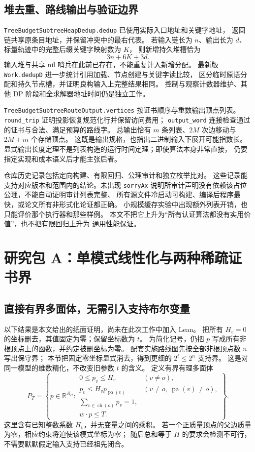 \documentclass[UTF8,a4paper,11pt,fontset=fandol]{ctexart}
\theoremstyle{definition}
\newcommand{\R}{\mathbb R}
\newcommand{\parv}{\operatorname{pa}}
\newcommand{\ch}{\operatorname{ch}}
\newcommand{\repo}[1]{\nolinkurl{#1}}
\begin{document}
\subsection{堆去重、路线输出与验证边界}

\repo{TreeBudgetSubtreeHeapDedup.dedup} 已使用实际入口地址和关键字地址，
返回链共享原条目地址，并保留冲突中的最右代表。
若输入链长为 $n$、输出长为 $d$、标量轨迹中的完整后缀关键字映射数为 $K$，
则新增持久堆槽恰为
\[
3n+6K+3d.
\]
输入堆与共享 nil 哨兵在此前已存在，不能重复计入新增分配。
最新版 \repo{Work.dedupD} 进一步统计引用加载、节点创建与关键字读比较，
区分临时原语分配和持久节点槽，并证明良构输入上完整结果相同。
控制与观察计数器维护、其他 DP 阶段和全求解器地址时间仍是独立工作。

\repo{TreeBudgetSubtreeRouteOutput.vertices} 按证书顺序与重数输出顶点列表。
\repo{round_trip} 证明投影恢复规范化行并保留访问费用；
\repo{output_word} 连接检查通过的证书与合法、满足预算的路线字。
总输出恰有 $m$ 条列表、$2M$ 次边移动与 $2M+m$ 个存储顶点。
这既是输出规格，也指出二进制输入下展开可能指数长。
显式输出长度定理不是列表构造的运行时间定理；即使算法本身非常直接，
仍要指定实现和成本语义后才能主张后者。

仓库历史记录包括定向构建、有限回归、公理审计和独立枚举比对。
这些记录能支持对应版本和范围内的结论。未出现 \repo{sorryAx}
说明所审计声明没有依赖该占位公理，不能自动证明审计列表完整、
所有源文件冷启动可构建、编译后程序最快，或论文所有非形式化论证都正确。
小规模缓存实验中出现额外列表开销，也只能评价那个执行器和那些样例。
本文不把它上升为“所有认证算法都没有实用价值”，也不把有限回归上升为
通用性能保证。

\section{研究包 A：单模式线性化与两种稀疏证书界}\label{sec:sparse}

\subsection{直接有界多面体，无需引入支持布尔变量}

以下结果是本文给出的纸面证明，尚未在此次工作中加入 Lean。
把所有 $H_v=0$ 的坐标删去，其值固定为零；保留坐标数为 $t$。
为简化记号，仍把 $p$ 写成所有非根顶点上的函数，并约定被删坐标为零。
配套实施路线图先按全部非根顶点数 $n$ 写出保守界；
本节把固定零坐标显式消去，得到更细的 $2^t\le2^n$ 支持界。
这是对同一模型的维数精化，不改变旧参数 $t$ 的含义。
定义有界有理多面体
\begin{equation}\label{eq:polytope}
P_T=\left\{p\in\R^{A_H}:
\begin{array}{ll}
0\le p_v\le H_v & (v\neq o),\\
p_v\le H_v p_{\parv(v)}
 & (v\neq o,\ \parv(v)\neq o),\\
\sum_{v\in\ch(o)}p_v=1,&\\
w\cdot p\le T.&
\end{array}\right\}.
\end{equation}
这里含有已知整数系数 $H_v$，并无变量之间的乘积。
若一个正质量顶点的父边质量为零，相应约束将迫使该模式坐标为零；
随后总和等于 $H$ 的要求会检测不可行，不需要默默假定输入支持已经祖先闭合。
\end{document}
